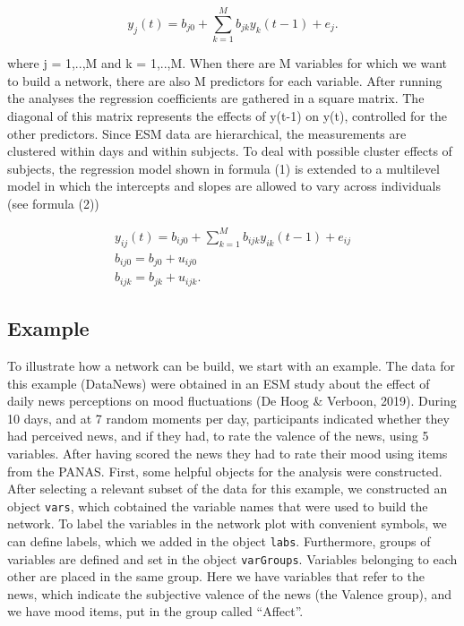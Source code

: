 \documentclass[man,floatsintext]{apa6}
\begin{document}
\begin{equation}
 y_j(t) = b_{j0} + \sum_{k=1}^{M} b_{jk} y_k(t-1) + e_j.
\end{equation}

where j = 1,..,M and k = 1,..,M. When there are M variables for which we
want to build a network, there are also M predictors for each variable.
After running the analyses the regression coefficients are gathered in a
square matrix. The diagonal of this matrix represents the effects of
y(t-1) on y(t), controlled for the other predictors. Since ESM data are
hierarchical, the measurements are clustered within days and within
subjects. To deal with possible cluster effects of subjects, the
regression model shown in formula (1) is extended to a multilevel model
in which the intercepts and slopes are allowed to vary across
individuals (see formula (2))

\begin{equation}
 \begin{split}
y_{ij}(t) = b_{ij0} + \sum_{k=1}^{M} b_{ijk} y_{ik}(t-1) + e_{ij}\\
b_{ij0} = b_{j0} + u_{ij0}\\ 
b_{ijk} = b_{jk} + u_{ijk}. 
 \end{split}
\end{equation}

\subsection{Example}\label{example}

To illustrate how a network can be build, we start with an example. The
data for this example (DataNews) were obtained in an ESM study about the
effect of daily news perceptions on mood fluctuations (De Hoog \&
Verboon, 2019). During 10 days, and at 7 random moments per day,
participants indicated whether they had perceived news, and if they had,
to rate the valence of the news, using 5 variables. After having scored
the news they had to rate their mood using items from the PANAS. First,
some helpful objects for the analysis were constructed. After selecting
a relevant subset of the data for this example, we constructed an object
\texttt{vars}, which cobtained the variable names that were used to
build the network. To label the variables in the network plot with
convenient symbols, we can define labels, which we added in the object
\texttt{labs}. Furthermore, groups of variables are defined and set in
the object \texttt{varGroups}. Variables belonging to each other are
placed in the same group. Here we have variables that refer to the news,
which indicate the subjective valence of the news (the Valence group),
and we have mood items, put in the group called \enquote{Affect}.
\end{document}
